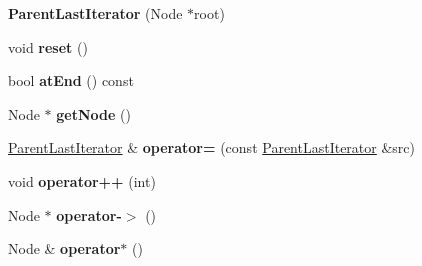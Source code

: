 \begin{DoxyCompactItemize}
\item 
{\bfseries Parent\+Last\+Iterator} (Node $\ast$root)\hypertarget{classirr_1_1core_1_1map_1_1ParentLastIterator_a90bee57feae21230e63cd1db5aef0474}{}\label{classirr_1_1core_1_1map_1_1ParentLastIterator_a90bee57feae21230e63cd1db5aef0474}

\item 
void {\bfseries reset} ()\hypertarget{classirr_1_1core_1_1map_1_1ParentLastIterator_af044bc095a91a28888e747cea4a88d14}{}\label{classirr_1_1core_1_1map_1_1ParentLastIterator_af044bc095a91a28888e747cea4a88d14}

\item 
bool {\bfseries at\+End} () const \hypertarget{classirr_1_1core_1_1map_1_1ParentLastIterator_aac8bdae26b1c4f2f9fd7c335eda6d559}{}\label{classirr_1_1core_1_1map_1_1ParentLastIterator_aac8bdae26b1c4f2f9fd7c335eda6d559}

\item 
Node $\ast$ {\bfseries get\+Node} ()\hypertarget{classirr_1_1core_1_1map_1_1ParentLastIterator_a796c59daef23201b69c9ebec455e646a}{}\label{classirr_1_1core_1_1map_1_1ParentLastIterator_a796c59daef23201b69c9ebec455e646a}

\item 
\hyperlink{classirr_1_1core_1_1map_1_1ParentLastIterator}{Parent\+Last\+Iterator} \& {\bfseries operator=} (const \hyperlink{classirr_1_1core_1_1map_1_1ParentLastIterator}{Parent\+Last\+Iterator} \&src)\hypertarget{classirr_1_1core_1_1map_1_1ParentLastIterator_a23a2c49c36ad6913ceb2b4398f7d66b7}{}\label{classirr_1_1core_1_1map_1_1ParentLastIterator_a23a2c49c36ad6913ceb2b4398f7d66b7}

\item 
void {\bfseries operator++} (int)\hypertarget{classirr_1_1core_1_1map_1_1ParentLastIterator_ac853023c517549bb3f7eb6d87224948e}{}\label{classirr_1_1core_1_1map_1_1ParentLastIterator_ac853023c517549bb3f7eb6d87224948e}

\item 
Node $\ast$ {\bfseries operator-\/$>$} ()\hypertarget{classirr_1_1core_1_1map_1_1ParentLastIterator_af9cda22394f295d90d47cb3714e9e1b2}{}\label{classirr_1_1core_1_1map_1_1ParentLastIterator_af9cda22394f295d90d47cb3714e9e1b2}

\item 
Node \& {\bfseries operator$\ast$} ()\hypertarget{classirr_1_1core_1_1map_1_1ParentLastIterator_acb7a240c0adbf19fbd90ee1736e6fc62}{}\label{classirr_1_1core_1_1map_1_1ParentLastIterator_acb7a240c0adbf19fbd90ee1736e6fc62}

\end{DoxyCompactItemize}


